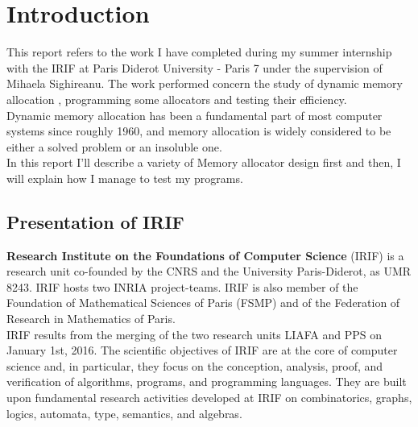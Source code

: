\section{Introduction}

This report refers to the work I have completed during my summer internship with the IRIF at  Paris Diderot University - Paris 7 under the supervision of Mihaela Sighireanu. The work performed concern the study  of dynamic memory allocation , programming some allocators and testing their efficiency.\\

Dynamic memory allocation has been a fundamental part of most computer systems since roughly 1960, and memory allocation is widely considered to be either a solved problem or an insoluble one.\\

 In this report I'll describe a variety of Memory allocator design first and then, I will explain how I manage to test my programs.





\subsection{Presentation of IRIF}
\textbf{Research Institute on the Foundations of Computer Science }
(IRIF) is a research unit co-founded by the CNRS and the University Paris-Diderot, as UMR 8243. IRIF hosts two INRIA project-teams. IRIF is also member of the Foundation of Mathematical Sciences of Paris (FSMP) and of the Federation of Research in Mathematics of Paris. \\

IRIF results from the merging of the two research units LIAFA and PPS on January 1st, 2016. The scientific objectives of IRIF are at the core of computer science and, in particular, they focus on the conception, analysis, proof, and verification of algorithms, programs, and programming languages. They are built upon fundamental research activities developed at IRIF on combinatorics, graphs, logics, automata, type, semantics, and algebras.\\

